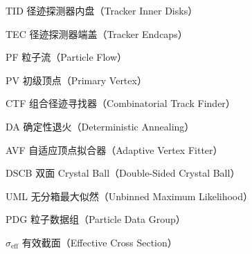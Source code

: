\begin{denotation}[3cm]
  \item[TID] 径迹探测器内盘（Tracker Inner Disks）
  \item[TEC] 径迹探测器端盖（Tracker Endcaps）
  \item[PF] 粒子流（Particle Flow）
  \item[PV] 初级顶点（Primary Vertex）
  \item[CTF] 组合径迹寻找器（Combinatorial Track Finder）
  \item[DA] 确定性退火（Deterministic Annealing）
  \item[AVF] 自适应顶点拟合器（Adaptive Vertex Fitter）
  \item[DSCB] 双面 Crystal Ball（Double-Sided Crystal Ball）
  \item[UML] 无分箱最大似然（Unbinned Maximum Likelihood）
  \item[PDG] 粒子数据组（Particle Data Group）
  \item[$\sigma_{\mathrm{eff}}$] 有效截面（Effective Cross Section）
\end{denotation}
